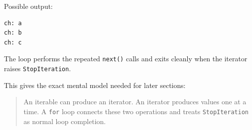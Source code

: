 Possible output:

\begin{verbatim}
ch: a
ch: b
ch: c
\end{verbatim}

The loop performs the repeated \texttt{next()} calls and exits cleanly when the iterator raises \texttt{StopIteration}.

This gives the exact mental model needed for later sections:

\begin{quote}
An iterable can produce an iterator. An iterator produces values one at a time. A \texttt{for} loop connects these two operations and treats \texttt{StopIteration} as normal loop completion.
\end{quote}